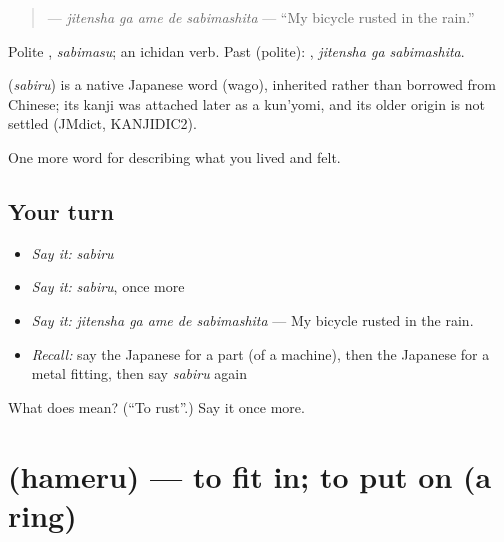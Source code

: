 \begin{quote}
\textbf{  } — \emph{jitensha ga ame de sabimashita} — \textquotedblleft{}My bicycle rusted in the rain.\textquotedblright{}
\end{quote}

Polite \textbf{}, \emph{sabimasu}; an ichidan verb. Past (polite): \textbf{ }, \emph{jitensha ga sabimashita}.

\begin{cousinweb}
\textbf{} (\emph{sabiru}) is a native Japanese word (wago), inherited rather than borrowed from Chinese; its kanji was attached later as a kun'yomi, and its older origin is not settled (JMdict, KANJIDIC2).
\end{cousinweb}

\begin{grammarlens}[title={What you've built}]
One more word for describing what you lived and felt.
\end{grammarlens}

\subsection*{Your turn}
\begin{itemize}
\raggedright
  \item \emph{Say it:} \emph{sabiru}
  \item \emph{Say it:} \emph{sabiru}, once more
  \item \emph{Say it:} \emph{jitensha ga ame de sabimashita} — My bicycle rusted in the rain.
  \item \emph{Recall:} say the Japanese for a part (of a machine), then the Japanese for a metal fitting, then say \emph{sabiru} again
\end{itemize}

\begin{tcolorbox}[breakable,colback=teal!4,colframe=teal!35!black,title={Before you move on}]
What does  mean? (\textquotedblleft{}To rust\textquotedblright{}.) Say it once more.
\end{tcolorbox}
\section[\texorpdfstring{\ja{はめる} (hameru)}{はめる (hameru)}]{ (hameru) — to fit in; to put on (a ring)}

\label{lesson:JA-C486-hameru}



